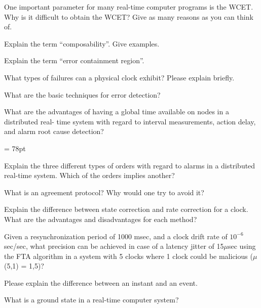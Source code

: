 
One important parameter for many real-time computer programs is the WCET. Why is it
difficult to obtain the WCET? Give as many reasons as you can think of.


Explain the term “composability”. Give examples.


Explain the term “error containment region”.


What types of failures can a physical clock exhibit? Please explain briefly.


What are the basic techniques for error detection?


 What are the advantages of having a global time available on nodes in a distributed real-
time system with regard to interval measurements, action delay, and alarm root cause
detection?

\pagebreak
\headheight = 78pt


Explain the three different types of orders with regard to alarms in a distributed real-time
system. Which of the orders implies another?



What is an agreement protocol? Why would one try to avoid it?


Explain the difference between state correction and rate correction for a clock. What are the
advantages and disadvantages for each method?


Given a resynchronization period of 1000 msec, and a clock drift rate of $10^{-6}$ sec/sec,
what precision can be achieved in case of a latency jitter of 15$\mu$sec using the FTA
algorithm in a system with 5 clocks where 1 clock could be malicious ($\mu$(5,1) = 1,5)?

\pagebreak



 Please explain the difference between an instant and an event.



What is a ground state in a real-time computer system?

\pagebreak

